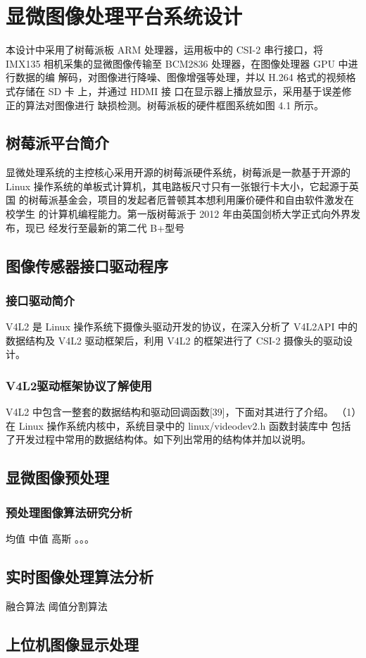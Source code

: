 \chapter{显微图像处理平台系统设计}
本设计中采用了树莓派板 ARM 处理器，运用板中的 CSI-2 串行接口，将 IMX135 相机采集的显微图像传输至 BCM2836 处理器，在图像处理器 GPU 中进行数据的编 解码，对图像进行降噪、图像增强等处理，并以 H.264 格式的视频格式存储在 SD 卡 上，并通过 HDMI 接
口在显示器上播放显示，采用基于误差修正的算法对图像进行 缺损检测。树莓派板的硬件框图系统如图 4.1 所示。
\section{树莓派平台简介}
显微处理系统的主控核心采用开源的树莓派硬件系统，树莓派是一款基于开源的 Linux 操作系统的单板式计算机，其电路板尺寸只有一张银行卡大小，它起源于英国 的树莓派基金会，项目的发起者厄普顿其本想利用廉价硬件和自由软件激发在校学生 的计算机编程能力。第一版树莓派于 2012 年由英国剑桥大学正式向外界发布，现已 经发行至最新的第二代 B+型号

\section{图像传感器接口驱动程序}
\subsection{接口驱动简介}
V4L2 是 Linux 操作系统下摄像头驱动开发的协议，在深入分析了 V4L2API 中的 数据结构及 V4L2 驱动框架后，利用 V4L2 的框架进行了 CSI-2 摄像头的驱动设计。 
\subsection{V4L2驱动框架协议了解使用}
V4L2 中包含一整套的数据结构和驱动回调函数[39]，下面对其进行了介绍。 （1）在 Linux 操作系统内核中，系统目录中的 linux/videodev2.h 函数封装库中 包括了开发过程中常用的数据结构体。如下列出常用的结构体并加以说明。


\section{显微图像预处理}
\subsection{预处理图像算法研究分析}
均值
中值
高斯
。。。
\section{实时图像处理算法分析}
融合算法
阈值分割算法

\section{上位机图像显示处理}


